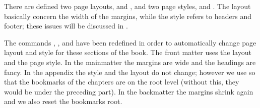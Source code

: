 There are defined two page layouts,  and ,
and two page styles,  and . The layout
basically concern the width of the margins, while the style refers to
headers and footer; these issues will be
discussed in .

The commands , , and
 have been redefined in order to automatically
change page layout and style for these sections of the book. The front
matter uses the  layout and the  page
style. In the mainmatter the margins are wide and the headings are
fancy. In the appendix the style and the layout do not change; however
we use  so that the bookmarks of
the chapters are on the root level (without this, they would be under
the preceding part). In the backmatter the margins shrink again and we
also reset the bookmarks root.
